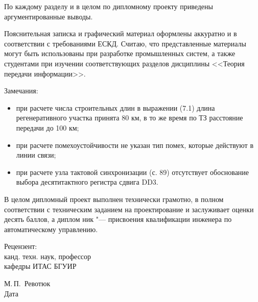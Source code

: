 \documentclass[]{lib/styles/additional-docs}
\begin{document}
\begin{singlespace}
{  По каждому разделу и в целом по дипломному проекту приведены аргументированные выводы.
  
  Пояснительная записка и графический материал оформлены аккуратно и в соответствии с требованиями ЕСКД.
  Считаю, что представленные материалы могут быть использованы при разработке промышленных систем, а также студентами при изучении соответствующих разделов дисциплины <<Теория передачи информации>>.
  
  Замечания:
  \begin{itemize}
    \item при расчете числа строительных длин в выражении (7.1) длина регенеративного участка принята 80 км, в то же время по ТЗ расстояние передачи до 100 км;
    \item при расчете помехоустойчивости не указан тип помех, которые действуют в линии связи;
    \item при расчете узла тактовой синхронизации (с. 89) отсутствует обоснование выбора десятитактного регистра сдвига DD3.
  \end{itemize}
  
  В целом дипломный проект выполнен технически грамотно, в полном соответствии с техническим заданием на проектирование и заслуживает оценки десять баллов, а диплом
  ник \me "--- присвоения квалификации инженера по автоматическому управлению.
  
    \vfill
    \noindent
    \begin{minipage}{0.4\textwidth}
      \begin{flushleft}
        Рецензент:\\
        канд. техн. наук, профессор\\
        кафедры ИТАС БГУИР
      \end{flushleft}
    \end{minipage}
    \begin{minipage}{0.58\textwidth}
      \begin{flushright}
      \underline{\hspace*{3cm}}\hspace*{0.5cm}\underline{\hspace*{2cm}} М.\,П.~Ревотюк \\
      Дата\hspace*{6.5cm}
      \end{flushright}
    \end{minipage}
  }
  
\end{singlespace}
\clearpage
\end{document}
